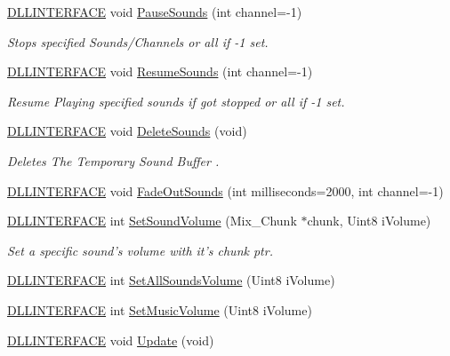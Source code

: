 \begin{DoxyCompactItemize}
\hyperlink{_s_d_l__ep_8h_a38dd54df4631b4daf553096353d7b20b}{D\-L\-L\-I\-N\-T\-E\-R\-F\-A\-C\-E} void \hyperlink{classc_audio_ab157d4e24666412e49160f5944087c60}{Pause\-Sounds} (int channel=-\/1)
\begin{DoxyCompactList}\small\item\em Stops specified Sounds/\-Channels or all if -\/1 set. \end{DoxyCompactList}\item 
\hyperlink{_s_d_l__ep_8h_a38dd54df4631b4daf553096353d7b20b}{D\-L\-L\-I\-N\-T\-E\-R\-F\-A\-C\-E} void \hyperlink{classc_audio_a298639f5e46882eb24b5ce08ec6bb1a3}{Resume\-Sounds} (int channel=-\/1)
\begin{DoxyCompactList}\small\item\em Resume Playing specified sounds if got stopped or all if -\/1 set. \end{DoxyCompactList}\item 
\hyperlink{_s_d_l__ep_8h_a38dd54df4631b4daf553096353d7b20b}{D\-L\-L\-I\-N\-T\-E\-R\-F\-A\-C\-E} void \hyperlink{classc_audio_a4440606285982326c456b23118b7d245}{Delete\-Sounds} (void)
\begin{DoxyCompactList}\small\item\em Deletes The Temporary Sound Buffer . \end{DoxyCompactList}\item 
\hyperlink{_s_d_l__ep_8h_a38dd54df4631b4daf553096353d7b20b}{D\-L\-L\-I\-N\-T\-E\-R\-F\-A\-C\-E} void \hyperlink{classc_audio_a4662912a2d84b8047662f97f1f92d5f0}{Fade\-Out\-Sounds} (int milliseconds=2000, int channel=-\/1)
\item 
\hyperlink{_s_d_l__ep_8h_a38dd54df4631b4daf553096353d7b20b}{D\-L\-L\-I\-N\-T\-E\-R\-F\-A\-C\-E} int \hyperlink{classc_audio_a5561e9289154d175e181bc6e2a3d9384}{Set\-Sound\-Volume} (Mix\-\_\-\-Chunk $\ast$chunk, Uint8 i\-Volume)
\begin{DoxyCompactList}\small\item\em Set a specific sound's volume with it's chunk ptr. \end{DoxyCompactList}\item 
\hyperlink{_s_d_l__ep_8h_a38dd54df4631b4daf553096353d7b20b}{D\-L\-L\-I\-N\-T\-E\-R\-F\-A\-C\-E} int \hyperlink{classc_audio_a7ad354ffe2a9aaa331a98920178a9721}{Set\-All\-Sounds\-Volume} (Uint8 i\-Volume)
\item 
\hyperlink{_s_d_l__ep_8h_a38dd54df4631b4daf553096353d7b20b}{D\-L\-L\-I\-N\-T\-E\-R\-F\-A\-C\-E} int \hyperlink{classc_audio_a0461c953d79bba40f59c7a6b5a5566f8}{Set\-Music\-Volume} (Uint8 i\-Volume)
\item 
\hyperlink{_s_d_l__ep_8h_a38dd54df4631b4daf553096353d7b20b}{D\-L\-L\-I\-N\-T\-E\-R\-F\-A\-C\-E} void \hyperlink{classc_audio_a964b3d86635b460a4f25cf64997b0014}{Update} (void)
\end{DoxyCompactItemize}
